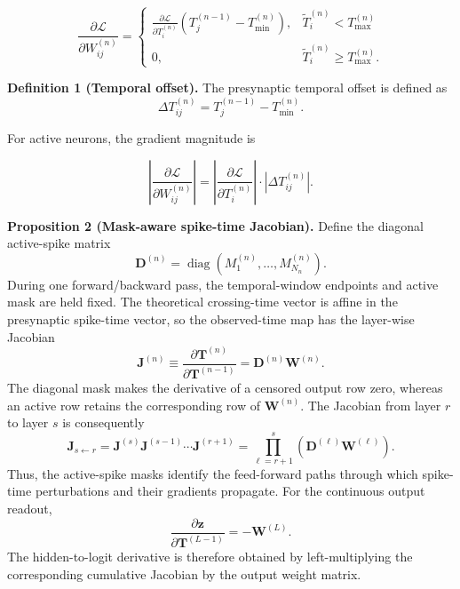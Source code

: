 ﻿\documentclass[12pt]{article}
\begin{document}
\begin{equation}
\frac{\partial \mathcal{L}}{\partial W_{ij}^{(n)}} =
\begin{cases}
\displaystyle
\frac{\partial \mathcal{L}}{\partial T_i^{(n)}}
\left(
T_j^{(n-1)} - T_{\min}^{(n)}
\right),
& \tilde{T}_i^{(n)} < T_{\max}^{(n)} \\[1.0ex]
0,
& \tilde{T}_i^{(n)} \ge T_{\max}^{(n)}.
\end{cases}
\label{eq:supp_gradient_piecewise}
\end{equation}

\textbf{Definition 1 (Temporal offset).}
The presynaptic temporal offset is defined as
\[
\Delta T_{ij}^{(n)} = T_j^{(n-1)} - T_{\min}^{(n)}.
\]

For active neurons, the gradient magnitude is

\[
\left|
\frac{\partial \mathcal{L}}{\partial W_{ij}^{(n)}}
\right|
=
\left|
\frac{\partial \mathcal{L}}{\partial T_i^{(n)}}
\right|
\cdot
|\Delta T_{ij}^{(n)}|.
\]

\textbf{Proposition 2 (Mask-aware spike-time Jacobian).}
Define the diagonal active-spike matrix
\[
\mathbf{D}^{(n)}=\operatorname{diag}\!\left(M_1^{(n)},\ldots,M_{N_n}^{(n)}\right).
\]
During one forward/backward pass, the temporal-window endpoints and active mask are held fixed. The theoretical crossing-time vector is affine in the presynaptic spike-time vector, so the observed-time map has the layer-wise Jacobian
\begin{equation}
\mathbf{J}^{(n)}
\equiv
\frac{\partial \mathbf{T}^{(n)}}{\partial \mathbf{T}^{(n-1)}}
=
\mathbf{D}^{(n)}\mathbf{W}^{(n)}.
\label{eq:supp_masked_jacobian}
\end{equation}
The diagonal mask makes the derivative of a censored output row zero, whereas an active row retains the corresponding row of $\mathbf{W}^{(n)}$. The Jacobian from layer $r$ to layer $s$ is consequently
\begin{equation}
\mathbf{J}_{s\leftarrow r}
=
\mathbf{J}^{(s)}\mathbf{J}^{(s-1)}\cdots\mathbf{J}^{(r+1)}
=
\prod_{\ell=r+1}^{s}\left(\mathbf{D}^{(\ell)}\mathbf{W}^{(\ell)}\right).
\label{eq:supp_cumulative_jacobian}
\end{equation}
Thus, the active-spike masks identify the feed-forward paths through which spike-time perturbations and their gradients propagate. For the continuous output readout,
\[
\frac{\partial\mathbf{z}}{\partial\mathbf{T}^{(L-1)}}=-\mathbf{W}^{(L)}.
\]
The hidden-to-logit derivative is therefore obtained by left-multiplying the corresponding cumulative Jacobian by the output weight matrix.
\end{document}
